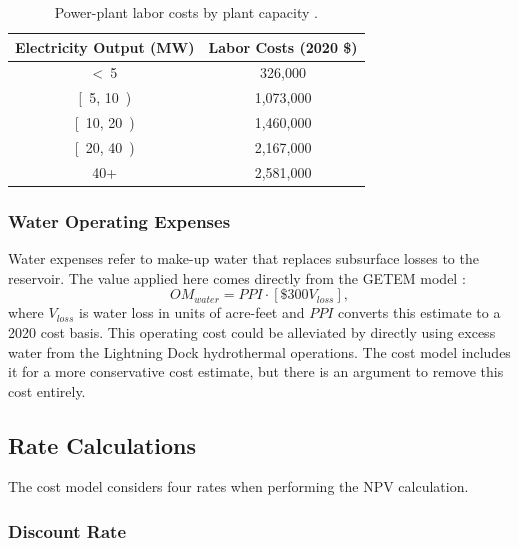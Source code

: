 \begin{table}[!htp]
\centering
\begin{tabular}{|c|c|}
\hline
\textbf{Electricity Output (MW)} & \textbf{Labor Costs (2020 \$)} \\ \hline
\textless\ 5 & 326,000 \\ \hline
{[}\ 5, 10\ ) & 1,073,000 \\ \hline
{[}\ 10, 20\ ) & 1,460,000 \\ \hline
{[}\ 20, 40\ ) & 2,167,000 \\ \hline
40+ & 2,581,000 \\ \hline
\end{tabular}
\caption[Power plant labor costs]{Power-plant labor costs by plant capacity  \protect\citep{beckers_introducing_2013}.}
\label{tab:labor_costs}
\end{table}

\subsubsection{Water Operating Expenses}\label{ch4:cm_opex_water}

Water expenses refer to make-up water that replaces subsurface losses to the reservoir. The value applied here comes directly from the GETEM model \citep{eere_getem_2012}:
\begin{equation}
\label{eq:cm_om_water}
    OM_{water} = PPI \cdot \left[\$300 %
    V_{loss}\right],
\end{equation}
where $V_{loss}$ is water loss in units of acre-feet and $PPI$ converts this estimate to a 2020 cost basis. This operating cost could be alleviated by directly using excess water from the Lightning Dock hydrothermal operations. The cost model includes it for a more conservative cost estimate, but there is an argument to remove this cost entirely.

\subsection{Rate Calculations}\label{ch4:cm_rate_calcs}

The cost model considers four rates when performing the NPV calculation.

\subsubsection{Discount Rate}\label{ch4:discount_rate}

